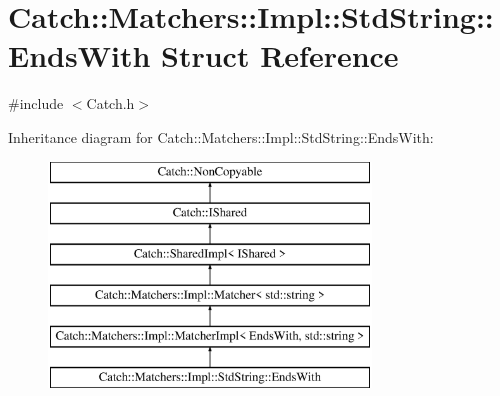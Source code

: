 \hypertarget{struct_catch_1_1_matchers_1_1_impl_1_1_std_string_1_1_ends_with}{}\section{Catch\+:\+:Matchers\+:\+:Impl\+:\+:Std\+String\+:\+:Ends\+With Struct Reference}
\label{struct_catch_1_1_matchers_1_1_impl_1_1_std_string_1_1_ends_with}


{\ttfamily \#include $<$Catch.\+h$>$}

Inheritance diagram for Catch\+:\+:Matchers\+:\+:Impl\+:\+:Std\+String\+:\+:Ends\+With\+:\begin{figure}[H]
\begin{center}
\leavevmode
\includegraphics[height=6.000000cm]{struct_catch_1_1_matchers_1_1_impl_1_1_std_string_1_1_ends_with}
\end{center}
\end{figure}
